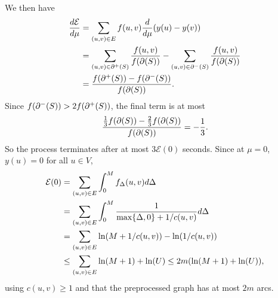 \documentclass[12pt]{article}
\begin{document}
We then have
\begin{align*}
  \frac{d\mathcal{E}}{d\mu} & = \sum_{(u, v) \in E} f(u, v)\frac{d}{d\mu}\paren{y(u) - y(v)}                                                    \\
                            & = \sum_{(u, v) \in \outcut{S}} \frac{f(u, v)}{f(\cut{S})} - \sum_{(u, v) \in \incut{S}}\frac{f(u, v)}{f(\cut{S})} \\
                            & = \frac{f(\outcut{S}) - f(\incut{S})}{f(\cut{S})}.
\end{align*}
Since $f(\incut{S}) > 2f(\outcut{S})$, the final term is at most
\[
  \frac{\frac{1}{3}f(\cut{S}) - \frac{2}{3}f(\cut{S})}{f(\cut{S})} = -\frac{1}{3}.
\]
So the process terminates after at most $3\mathcal{E}(0)$ seconds. Since at
$\mu = 0$, $y(u) = 0$ for all $u \in V$,
\begin{align*}
  \mathcal{E}(0) & = \sum_{(u, v) \in E} \int_0^M f_\Delta(u, v) d\Delta                            \\
                 & = \sum_{(u, v) \in E} \int_0^M \frac{1}{\max\Set{\Delta, 0} + 1/c(u, v)} d\Delta \\
                 & = \sum_{(u, v) \in E} \ln(M + 1/c(u, v)) - \ln(1/c(u, v))                        \\
                 & \leq \sum_{(u, v) \in E} \ln(M + 1) + \ln(U) \leq 2m(\ln(M + 1) + \ln(U)),
\end{align*}
using $c(u, v) \geq 1$ and that the preprocessed graph has at most $2m$ arcs.
\end{document}
